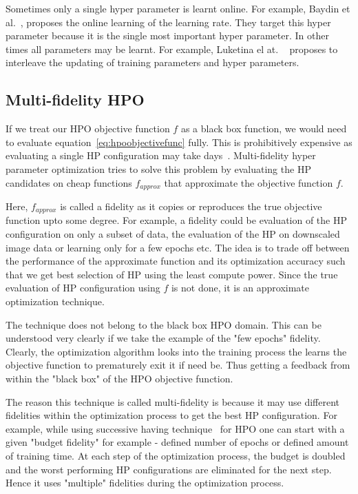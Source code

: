\documentclass[12pt, twoside, ngerman]{report}
\begin{document}
Sometimes only a single hyper parameter is learnt online.
For example,  Baydin et al.~\cite{onlineLearningRateUpdate},  proposes the online learning of the learning rate.  They target this hyper parameter because it is the single most important hyper parameter.
In other times all parameters may be learnt.
For example,  Luketina el at. ~\cite{gradientbasedHPOtuning} proposes to interleave the updating of training parameters and hyper parameters.


\subsection{Multi-fidelity HPO}
If we treat our HPO objective function $f$ as a black box function,  we would need to evaluate equation~\ref{eq:hpoobjectivefunc} fully.
This is prohibitively expensive as evaluating a single HP configuration may take days~\cite{hutter2019automated}.
Multi-fidelity hyper parameter optimization tries to solve this problem by evaluating the HP candidates on cheap functions $f_{approx}$ that approximate the objective function $f$.

Here, $f_{approx}$  is called a fidelity as it copies or reproduces the true objective function upto some degree.
For example,  a fidelity could be evaluation of the HP configuration on only a subset of data,  the evaluation of the HP on downscaled image data or learning only for a few epochs etc.
The idea is to trade off between the performance of the approximate function and its optimization accuracy such that we get best selection of HP using the least compute power.
Since the true evaluation of HP configuration using $f$ is not done,  it is an approximate optimization technique.

The technique does not belong to the black box HPO domain.
This can be understood very clearly if we take the example of the "few epochs" fidelity.
Clearly,  the optimization algorithm looks into the training process the learns the objective function to prematurely exit it if need be.
Thus getting a feedback from within the "black box" of the HPO objective function.

The reason this technique is called multi-fidelity is because it may use different fidelities within the optimization process to get the best HP configuration.
For example,  while using successive having technique~\cite{successivehalving} for HPO one can start with a given "budget fidelity" for example - defined number of epochs or defined amount of training time.
At each step of the optimization process,  the budget is doubled and the worst performing HP configurations are eliminated for the next step.
Hence it uses "multiple" fidelities during the optimization process.
\end{document}
